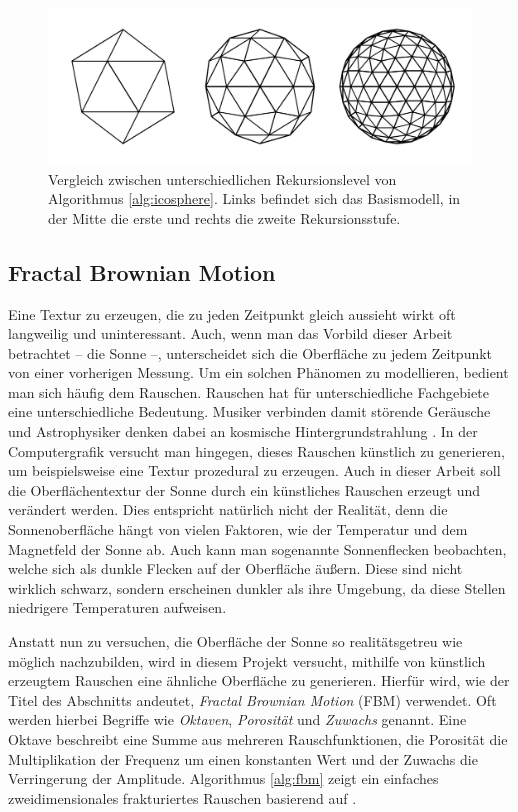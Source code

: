 \begin{figure}
  \includegraphics[width=\columnwidth]{icosphere-algorithm}
  \caption{Vergleich zwischen unterschiedlichen Rekursionslevel von Algorithmus \ref{alg:icosphere}. Links befindet sich das Basismodell, in der Mitte die erste und rechts die zweite Rekursionsstufe.}
  \label{fig:icosphere-levels}
  \Description[]{}
\end{figure}

\subsection{Fractal Brownian Motion}
Eine Textur zu erzeugen, die zu jeden Zeitpunkt gleich aussieht wirkt oft
langweilig und uninteressant. Auch, wenn man das Vorbild dieser Arbeit
betrachtet -- die Sonne --, unterscheidet sich die Oberfläche zu jedem
Zeitpunkt von einer vorherigen Messung. Um ein solchen Phänomen zu
modellieren, bedient man sich häufig dem Rauschen. Rauschen hat für
unterschiedliche Fachgebiete eine unterschiedliche Bedeutung. Musiker
verbinden damit störende Geräusche und Astrophysiker denken dabei an
kosmische Hintergrundstrahlung \cite{bookofshaders}. In der Computergrafik
versucht man hingegen, dieses Rauschen künstlich zu generieren, um
beispielsweise eine Textur prozedural zu erzeugen. Auch in dieser Arbeit soll
die Oberflächentextur der Sonne durch ein künstliches Rauschen erzeugt und
verändert werden. Dies entspricht natürlich nicht der Realität, denn die
Sonnenoberfläche hängt von vielen Faktoren, wie der Temperatur und dem
Magnetfeld der Sonne ab. Auch kann man sogenannte Sonnenflecken beobachten,
welche sich als dunkle Flecken auf der Oberfläche äußern. Diese sind nicht
wirklich schwarz, sondern erscheinen dunkler als ihre Umgebung, da diese
Stellen niedrigere Temperaturen aufweisen.

Anstatt nun zu versuchen, die Oberfläche der Sonne so realitätsgetreu wie
möglich nachzubilden, wird in diesem Projekt versucht, mithilfe von künstlich
erzeugtem Rauschen eine ähnliche Oberfläche zu generieren. Hierfür wird, wie
der Titel des Abschnitts andeutet, \textit{Fractal Brownian Motion} (FBM) verwendet.
Oft werden hierbei Begriffe wie \textit{Oktaven}, \textit{Porosität} und
\textit{Zuwachs} genannt. Eine Oktave beschreibt eine Summe aus mehreren
Rauschfunktionen, die Porosität die Multiplikation der Frequenz um einen konstanten
Wert und der Zuwachs die Verringerung der Amplitude. Algorithmus \ref{alg:fbm} zeigt
ein einfaches zweidimensionales frakturiertes Rauschen basierend auf \cite{bookofshaders}.

